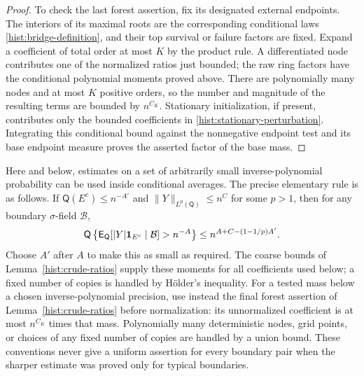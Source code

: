 \begin{proof}
To check the last forest assertion, fix its designated external endpoints.
The interiors of its maximal roots are the corresponding conditional laws
\eqref{hist:bridge-definition}, and their top survival or failure factors
are fixed.  Expand a coefficient of total order at most $K$ by the product
rule.  A differentiated node contributes one of the normalized ratios just
bounded; the raw ring factors have the conditional polynomial moments
proved above.  There are polynomially many nodes and at most $K$ positive
orders, so the number and magnitude of the resulting terms are bounded by
$n^{C_K}$.  Stationary initialization, if present, contributes only the
bounded coefficients in \eqref{hist:stationary-perturbation}.  Integrating
this conditional bound against the nonnegative endpoint test and its base
endpoint measure proves the asserted factor of the base mass.
\end{proof}

Here and below, estimates on a set of arbitrarily small inverse-polynomial
probability can be used inside conditional averages.  The precise elementary
rule is as follows.  If $\mathsf Q(E^c)\le n^{-A'}$ and
$\|Y\|_{L^p(\mathsf Q)}\le n^C$ for some $p>1$, then for any boundary
$\sigma$-field $\mathcal B$,
\[
 \mathsf Q\left\{\mathsf E_{\mathsf Q}
       [|Y|\mathbf 1_{E^c}\mid\mathcal B]>n^{-A}\right\}
 \le n^{A+C-(1-1/p)A'}.
\]
Choose $A'$ after $A$ to make this as small as required.  The coarse bounds
of Lemma~\ref{hist:crude-ratios} supply these moments for all coefficients used
below; a fixed number of copies is handled by H\"older's inequality.
For a tested mass below a chosen inverse-polynomial precision, use instead
the final forest assertion of Lemma~\ref{hist:crude-ratios} before
normalization: its unnormalized coefficient is at most $n^{C_K}$ times
that mass.  Polynomially many deterministic nodes,
grid points, or choices of any fixed number of copies are handled by a union
bound.  These conventions never give a uniform assertion for every boundary
pair when the sharper estimate was proved only for typical boundaries.
